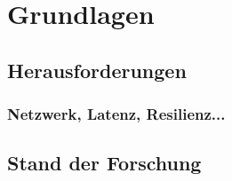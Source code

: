 \section{Grundlagen}



\subsection{Herausforderungen}
\subsubsection{Netzwerk, Latenz, Resilienz...}

\subsection{Stand der Forschung}